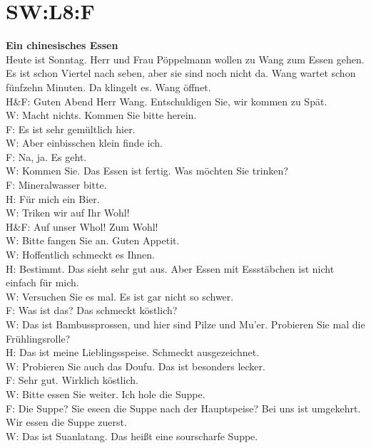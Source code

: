 \section{SW:L8:F}
\noindent
\textbf{Ein chinesisches Essen} \\
Heute ist Sonntag. Herr und Frau Pöppelmann wollen zu Wang zum Essen gehen.
Es ist schon Viertel nach seben, aber sie sind noch nicht da.
Wang wartet schon fünfzehn Minuten. Da klingelt es.  Wang öffnet. \\
H\&F: Guten Abend Herr Wang. Entschuldigen Sie, wir kommen zu Spät. \\
W: Macht nichts. Kommen Sie bitte herein. \\
F: Es ist sehr gemültlich hier.  \\
W: Aber einbisschen klein finde ich. \\
F: Na, ja. Es geht. \\
W: Kommen Sie. Das Essen ist fertig. Was möchten Sie trinken? \\
F: Mineralwasser bitte. \\
H: Für mich ein Bier. \\
W: Triken wir auf Ihr Wohl!  \\
H\&F: Auf unser Whol! Zum Wohl! \\
W: Bitte fangen Sie an. Guten Appetit. \\
W: Hoffentlich schmeckt es Ihnen.  \\
H: Bestimmt. Das sieht sehr gut aus. Aber Essen mit Essstäbchen ist nicht einfach für mich. \\
W: Versuchen Sie es mal. Es ist gar nicht so schwer.  \\
F: Was ist das? Das schmeckt köstlich?  \\
W: Das ist Bambussprossen, und hier sind Pilze und Mu'er.  Probieren Sie mal die Frühlingsrolle? \\
H: Das ist meine Lieblingsspeise. Schmeckt ausgezeichnet.  \\
W: Probieren Sie auch das Doufu. Das ist besonders lecker. \\
F: Sehr gut. Wirklich köstlich. \\
W: Bitte essen Sie weiter. Ich hole die Suppe. \\
F: Die Suppe? Sie eseen die Suppe nach der Hauptspeise? Bei uns ist umgekehrt.  Wir essen die Suppe zuerst. \\
W: Das ist Suanlatang. Das heißt eine sourscharfe Suppe. \\

